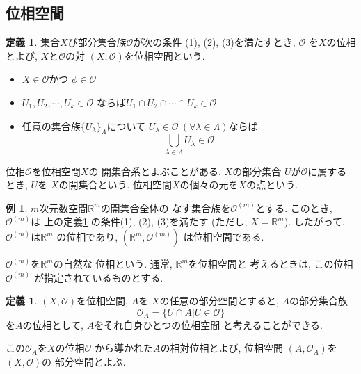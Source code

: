 \documentclass[a4j,12pt]{jarticle}
\theoremstyle{definition}
\newtheorem{definition}[theorem]{定義}
\newtheorem{example}[theorem]{例}
\begin{document}
\subsection{位相空間}
\begin{definition}\label{def:topological sapace}
    集合$X$び部分集合族$\mathcal{O}$が次の条件
    (1), (2), (3)を満たすとき, $\mathcal{O}$
    を$X$の位相とよび, $X$と$\mathcal{O}$の対
    $(X,\mathcal{O})$を位相空間という. 
    \begin{itemize}
        \item[(1)]$X\in \mathcal{O}$かつ
        $\phi \in \mathcal{O}$
        \item[(2)]
        $U_1,U_2, \cdots ,U_k\in \mathcal{O}$
        ならば$U_1\cap U_2\cap \cdots \cap U_k
        \in \mathcal{O}$
        \item[(3)]
        任意の集合族$\{U_\lambda\}_\Lambda$について
        $U_\lambda\in \mathcal{O}\ 
        (\forall \lambda \in \Lambda)$ならば
        $$\bigcup_{\lambda\in \Lambda}{U_\lambda}
        \in \mathcal{O}$$
    \end{itemize}
    位相$\mathcal{O}$を位相空間$X$の
    開集合系とよぶことがある. $X$の部分集合
    $U$が$\mathcal{O}$に属するとき, $U$を
    $X$の開集合という. 
    位相空間$X$の個々の元を$X$の点という. 
\end{definition}
\begin{example}
    $m$次元数空間$\mathbb{R}^m$の開集合全体の
    なす集合族を$\mathcal{O}^{(m)}$とする. 
    このとき, $\mathcal{O}^{(m)}$は
    上の定義\ref{def:topological sapace}
    の条件(1), (2), (3)を満たす
    (ただし, $X=\mathbb{R}^m$). したがって, 
    $\mathcal{O}^{(m)}$は$\mathbb{R}^m$
    の位相であり, $(\mathbb{R}^m, \mathcal{O}^{(m)})$
    は位相空間である.

    $\mathcal{O}^{(m)}$を$\mathbb{R}^m$の自然な
    位相という. 通常, $\mathbb{R}^m$を位相空間と
    考えるときは, この位相$\mathcal{O}^{(m)}$
    が指定されているものとする. 
\end{example}
\begin{definition}
    $(X, \mathcal{O})$を位相空間, $A$を
    $X$の任意の部分空間とすると, $A$の部分集合族
    $$\mathcal{O}_A=\{U\cap A|U\in \mathcal{O}\}$$
    を$A$の位相として, $A$をそれ自身ひとつの位相空間
    と考えることができる. 

    この$\mathcal{O}_A$を$X$の位相$\mathcal{O}$
    から導かれた$A$の相対位相とよび, 位相空間
    $(A,\mathcal{O}_A)$を$(X,\mathcal{O})$の
    部分空間とよぶ. 
\end{definition}
\end{document}
